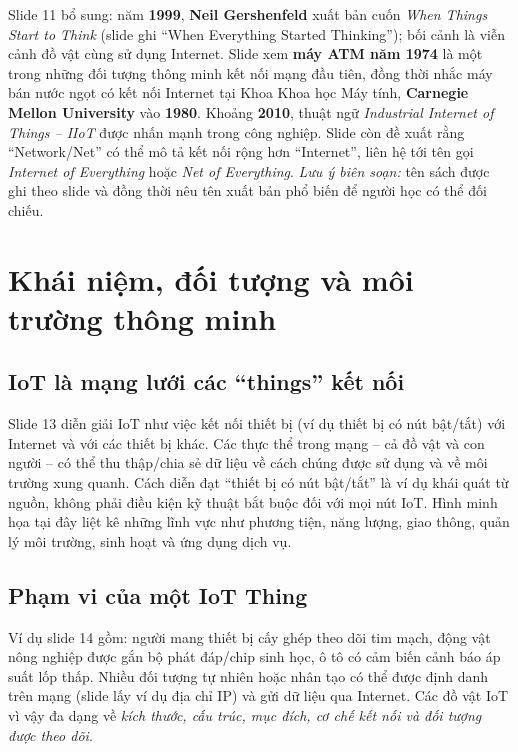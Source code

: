 Slide 11 bổ sung: năm \textbf{1999}, \textbf{Neil Gershenfeld} xuất bản cuốn \emph{When Things Start to Think} (slide ghi ``When Everything Started Thinking''); bối cảnh là viễn cảnh đồ vật cùng sử dụng Internet. Slide xem \textbf{máy ATM năm 1974} là một trong những đối tượng thông minh kết nối mạng đầu tiên, đồng thời nhắc máy bán nước ngọt có kết nối Internet tại Khoa Khoa học Máy tính, \textbf{Carnegie Mellon University} vào \textbf{1980}. Khoảng \textbf{2010}, thuật ngữ \emph{Industrial Internet of Things -- IIoT} được nhấn mạnh trong công nghiệp. Slide còn đề xuất rằng ``Network/Net'' có thể mô tả kết nối rộng hơn ``Internet'', liên hệ tới tên gọi \emph{Internet of Everything} hoặc \emph{Net of Everything}. \emph{Lưu ý biên soạn:} tên sách được ghi theo slide và đồng thời nêu tên xuất bản phổ biến để người học có thể đối chiếu.

\section{Khái niệm, đối tượng và môi trường thông minh}\label{sec:concepts}
\subsection{IoT là mạng lưới các ``things'' kết nối}
Slide 13 diễn giải IoT như việc kết nối thiết bị (ví dụ thiết bị có nút bật/tắt) với Internet và với các thiết bị khác. Các thực thể trong mạng -- cả đồ vật và con người -- có thể thu thập/chia sẻ dữ liệu về cách chúng được sử dụng và về môi trường xung quanh. Cách diễn đạt ``thiết bị có nút bật/tắt'' là ví dụ khái quát từ nguồn, không phải điều kiện kỹ thuật bắt buộc đối với mọi nút IoT. Hình minh họa tại đây liệt kê những lĩnh vực như phương tiện, năng lượng, giao thông, quản lý môi trường, sinh hoạt và ứng dụng dịch vụ.

\subsection{Phạm vi của một IoT Thing}
Ví dụ slide 14 gồm: người mang thiết bị cấy ghép theo dõi tim mạch, động vật nông nghiệp được gắn bộ phát đáp/chip sinh học, ô tô có cảm biến cảnh báo áp suất lốp thấp. Nhiều đối tượng tự nhiên hoặc nhân tạo có thể được định danh trên mạng (slide lấy ví dụ địa chỉ IP) và gửi dữ liệu qua Internet. Các đồ vật IoT vì vậy đa dạng về \emph{kích thước, cấu trúc, mục đích, cơ chế kết nối và đối tượng được theo dõi}. 

